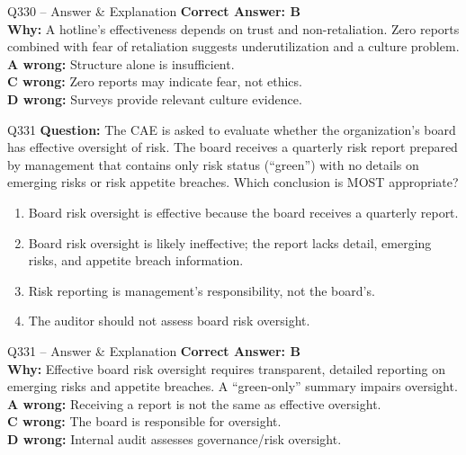 \documentclass[aspectratio=169,10pt]{beamer}
\begin{document}
	\begin{frame}[t]{Q330 -- Answer \& Explanation}
		\small
		\textbf{Correct Answer: B} \\[4pt]
		\textbf{Why:} A hotline's effectiveness depends on trust and non-retaliation. Zero reports combined with fear of retaliation suggests underutilization and a culture problem. \\[4pt]
		\textbf{A wrong:} Structure alone is insufficient. \\[2pt]
		\textbf{C wrong:} Zero reports may indicate fear, not ethics. \\[2pt]
		\textbf{D wrong:} Surveys provide relevant culture evidence.
	\end{frame}
	
	\begin{frame}[t]{Q331}
		\small
		\textbf{Question:} The CAE is asked to evaluate whether the organization's board has effective oversight of risk. The board receives a quarterly risk report prepared by management that contains only risk status (``green'') with no details on emerging risks or risk appetite breaches. Which conclusion is MOST appropriate?
		\begin{enumerate}[label=\Alph*.,itemsep=1pt,topsep=2pt]
			\item Board risk oversight is effective because the board receives a quarterly report.
			\item Board risk oversight is likely ineffective; the report lacks detail, emerging risks, and appetite breach information.
			\item Risk reporting is management's responsibility, not the board's.
			\item The auditor should not assess board risk oversight.
		\end{enumerate}
	\end{frame}
	
	\begin{frame}[t]{Q331 -- Answer \& Explanation}
		\small
		\textbf{Correct Answer: B} \\[4pt]
		\textbf{Why:} Effective board risk oversight requires transparent, detailed reporting on emerging risks and appetite breaches. A ``green-only'' summary impairs oversight. \\[4pt]
		\textbf{A wrong:} Receiving a report is not the same as effective oversight. \\[2pt]
		\textbf{C wrong:} The board is responsible for oversight. \\[2pt]
		\textbf{D wrong:} Internal audit assesses governance/risk oversight.
	\end{frame}
	
\end{document}
